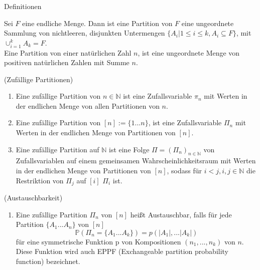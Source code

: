 \begin{section}{Definitionen}
\begin{Definition}
   Sei $F$ eine endliche Menge. Dann ist eine Partition von $F$ eine ungeordnete Sammlung von nichtleeren, disjunkten Untermengen $\{A_i| 1 \leq i \leq k, A_i \subseteq F\}$, mit $\cup_{i=1}^{k}A_k = F$.\\
   Eine Partition von einer natürlichen Zahl $n$, ist eine ungeordnete Menge von positiven natürlichen Zahlen mit Summe $n$.
\end{Definition}
\begin{Definition}
    \textnormal{(Zufällige Partitionen)}
\begin{enumerate}
    \item Eine zufällige Partition von $n\in \mathbb{N}$ ist eine Zufallsvariable $\pi_n$ mit Werten in der endlichen Menge von allen Partitionen von $n$.
    \item Eine zufällige Partition von $[n] := \{1 ...n\}$, ist eine Zufallsvariable $\Pi_n$ mit Werten in der endlichen Menge von Partitionen von $[n]$.
    \item Eine zufällige Partition auf $\mathbb{N}$ ist eine Folge $\Pi = (\Pi_n)_{n\in \mathbb{N}}$ von Zufallsvariablen auf einem gemeinsamen Wahrscheinlichkeitsraum mit Werten in der endlichen Menge von Partitionen von $[n]$, sodass für $i<j, i,j \in \mathbb{N}$ die Restriktion von $\Pi_j$ auf $[i]$ $\Pi_i$ ist.
\end{enumerate}

\end{Definition}
\begin{Definition}
    \textnormal{(Austauschbarkeit)}
    \label{Austauschbarkeit}
    \begin{enumerate}
        \item Eine zufällige Partition $\Pi_n$ von $[n]$ heißt Austauschbar, falls für jede Partition $\{ A_1 ... A_n\}$ von $[n]$
        \[ 
            \mathbb{P}(\Pi_n = \{ A_1 ... A_k\}) = p(|A_1|, ... |A_k|)
        \]  
        für eine symmetrische Funktion p von Kompositionen $(n_1, ..., n_k)$ von $n$. Diese Funktion wird auch EPPF (Exchangeable partition probability function) bezeichnet.

    \end{enumerate}
\end{Definition}

\end{section}